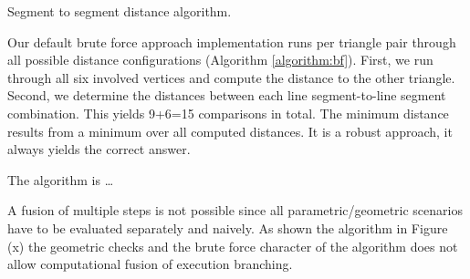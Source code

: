\begin{algorithm}
 \caption{Segment to segment distance algorithm.} \label{algorithm:bf}
 \begin{algorithmic}[1]
		
		
		
		\Else 
			
			
				
				
			\EndIf
				

				
			\EndIf
				


			\EndIf
								


			\EndIf							
		\EndIf
		
		
	\EndFunction
 \end{algorithmic}
\end{algorithm} 

%
%
Our default brute force approach implementation runs per triangle pair through all possible distance
configurations (Algorithm \ref{algorithm:bf}).
First, we run through all six involved vertices and compute the distance to the
other triangle.
Second, we determine the distances between each line segment-to-line segment combination.
This yields 9+6=15 comparisons in total.
The minimum distance results from a minimum over all computed distances.
It is a robust approach, it always yields the correct answer.


%
%
The algorithm is \ldots 

A fusion of multiple steps is not possible since all parametric/geometric scenarios have to be evaluated separately and naively. As shown the algorithm in Figure (x) the geometric checks and the brute force character of the algorithm does not allow computational fusion of execution branching. 



